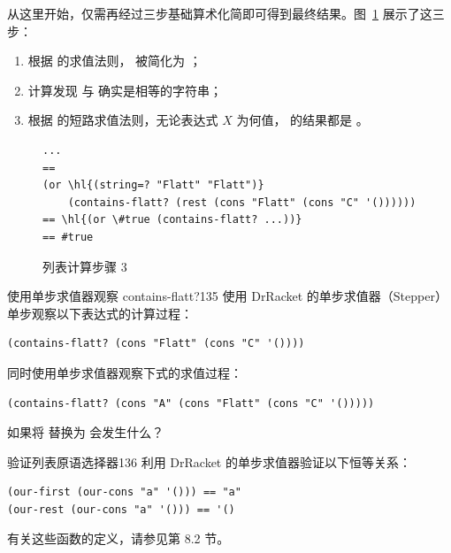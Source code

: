 从这里开始，仅需再经过三步基础算术化简即可得到最终结果。图~\ref{fig:computing_with_lists_step3} 展示了这三步：
\begin{enumerate}
  \item 根据  的求值法则， 被简化为 ；
  \item 计算发现  与  确实是相等的字符串；
  \item 根据  的短路求值法则，无论表达式 $X$ 为何值， 的结果都是 。
\end{enumerate}

\begin{figure}[htbp]
  \centering
  \begin{stepperbox}[unbreakable]
\begin{Verbatim}[commandchars=\\\{\}, fontsize=\scriptsize]
...
==
(or \hl{(string=? "Flatt" "Flatt")}
    (contains-flatt? (rest (cons "Flatt" (cons "C" '())))))
== \hl{(or \#true (contains-flatt? ...))}
== #true
\end{Verbatim}
  \end{stepperbox}
  \caption{列表计算步骤 3}
  \label{fig:computing_with_lists_step3}
\end{figure}

\begin{exercise}{使用单步求值器观察 contains-flatt?}{135}
使用 DrRacket 的单步求值器（Stepper）单步观察以下表达式的计算过程：
\begin{lstlisting}[language=BSL]
(contains-flatt? (cons "Flatt" (cons "C" '())))
\end{lstlisting}
同时使用单步求值器观察下式的求值过程：
\begin{lstlisting}[language=BSL]
(contains-flatt? (cons "A" (cons "Flatt" (cons "C" '()))))
\end{lstlisting}
如果将  替换为  会发生什么？
\end{exercise}

\begin{exercise}{验证列表原语选择器}{136}
利用 DrRacket 的单步求值器验证以下恒等关系：
\begin{lstlisting}[language=BSL]
(our-first (our-cons "a" '())) == "a"
(our-rest (our-cons "a" '())) == '()
\end{lstlisting}
有关这些函数的定义，请参见第 8.2 节。
\end{exercise}
